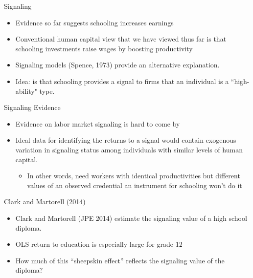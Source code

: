 \documentclass[blue]{beamer}
\begin{document}
{{{\begin{frame}{Signaling}
\begin{itemize}
\item Evidence so far suggests schooling increases earnings \medskip
\item Conventional human capital view that we have viewed thus far is that schooling investments raise wages by boosting productivity \medskip
\item Signaling models (Spence, 1973) provide an alternative explanation.
\item Idea: is that schooling provides a signal to firms that an individual is a ``high-ability" type.  
\end{itemize}
\end{frame}
\begin{frame}{Signaling Evidence}
\begin{itemize}
\item Evidence on labor market signaling is hard to come by{\small{}\medskip{}
}{\small \par}
\item Ideal data for identifying the returns to a signal would contain
exogenous variation in signaling status among individuals with similar
levels of human capital.
\begin{itemize}
\medskip
\item In other words, need workers with identical productivities but different
values of an observed credential \textendash{} an instrument for schooling
won't do it{\small{}\medskip{}
}{\small \par}
\end{itemize}
\end{itemize}
\end{frame}

\begin{frame}{Clark and Martorell (2014)}

\begin{itemize}
\item Clark and Martorell (JPE 2014) estimate the signaling value of a high school diploma. {\small{}\medskip{}
}{\small \par}
\item OLS return to education is especially large for grade 12{\small{}\medskip{}
}{\small \par}
\item How much of this ``sheepskin effect'' reflects the signaling value
of the diploma?
\end{itemize}
\end{frame}

}}}
\end{document}
